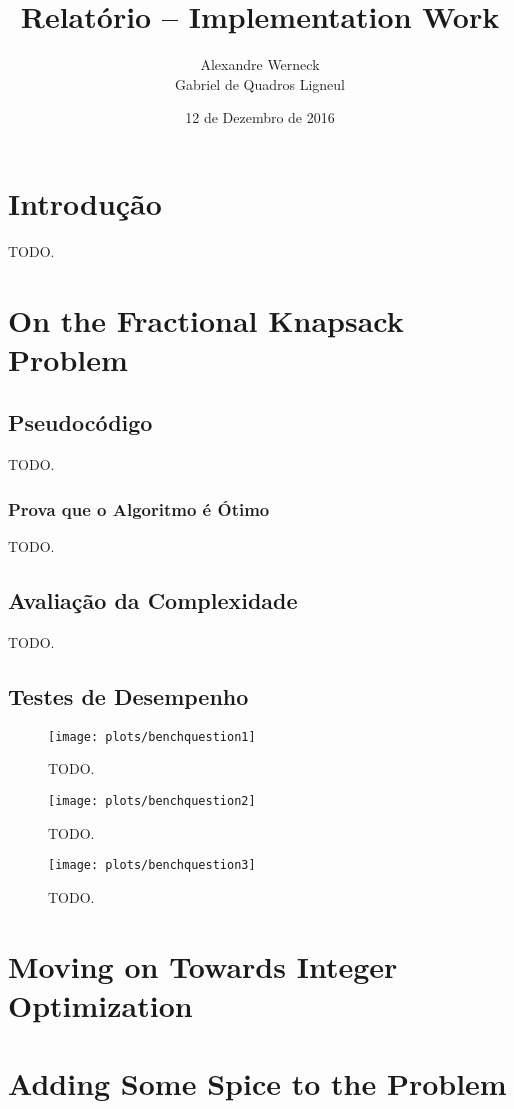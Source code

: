 \documentclass[a4paper, 11pt]{article}
\title{Relatório -- Implementation Work}
\author{Alexandre Werneck\\Gabriel de Quadros Ligneul}
\date{12 de Dezembro de 2016}
\begin{document}
\maketitle

\section{Introdução}

TODO.

\section{On the Fractional Knapsack Problem}

\subsection{Pseudocódigo}

TODO.

\subsubsection{Prova que o Algoritmo é Ótimo}

TODO.

\subsection{Avaliação da Complexidade}

TODO.

\subsection{Testes de Desempenho}

\begin{figure}[H]
  \centering
  \texttt{[image: plots/benchquestion1]}
  \caption{TODO.}
  \label{fig:benchquestion1}
\end{figure}

\begin{figure}[H]
  \centering
  \texttt{[image: plots/benchquestion2]}
  \caption{TODO.}
  \label{fig:benchquestion2}
\end{figure}

\begin{figure}[H]
  \centering
  \texttt{[image: plots/benchquestion3]}
  \caption{TODO.}
  \label{fig:benchquestion3}
\end{figure}


\section{Moving on Towards Integer Optimization}

\section{Adding Some Spice to the Problem}
\end{document}
